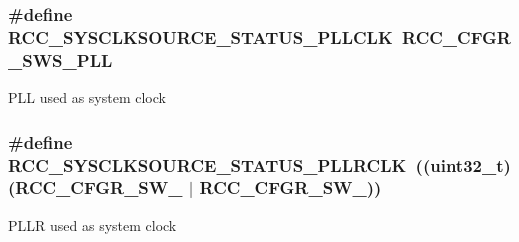 \subsubsection[{\texorpdfstring{R\+C\+C\+\_\+\+S\+Y\+S\+C\+L\+K\+S\+O\+U\+R\+C\+E\+\_\+\+S\+T\+A\+T\+U\+S\+\_\+\+P\+L\+L\+C\+LK}{RCC_SYSCLKSOURCE_STATUS_PLLCLK}}]{\setlength{\rightskip}{0pt plus 5cm}\#define R\+C\+C\+\_\+\+S\+Y\+S\+C\+L\+K\+S\+O\+U\+R\+C\+E\+\_\+\+S\+T\+A\+T\+U\+S\+\_\+\+P\+L\+L\+C\+LK~{\bf R\+C\+C\+\_\+\+C\+F\+G\+R\+\_\+\+S\+W\+S\+\_\+\+P\+LL}}\hypertarget{group___r_c_c___system___clock___source___status_ga4f05019ec09da478d084f44dbaad7d6d}{}\label{group___r_c_c___system___clock___source___status_ga4f05019ec09da478d084f44dbaad7d6d}
P\+LL used as system clock 
\subsubsection[{\texorpdfstring{R\+C\+C\+\_\+\+S\+Y\+S\+C\+L\+K\+S\+O\+U\+R\+C\+E\+\_\+\+S\+T\+A\+T\+U\+S\+\_\+\+P\+L\+L\+R\+C\+LK}{RCC_SYSCLKSOURCE_STATUS_PLLRCLK}}]{\setlength{\rightskip}{0pt plus 5cm}\#define R\+C\+C\+\_\+\+S\+Y\+S\+C\+L\+K\+S\+O\+U\+R\+C\+E\+\_\+\+S\+T\+A\+T\+U\+S\+\_\+\+P\+L\+L\+R\+C\+LK~((uint32\+\_\+t)({\bf R\+C\+C\+\_\+\+C\+F\+G\+R\+\_\+\+S\+W\+\_} $\vert$ {\bf R\+C\+C\+\_\+\+C\+F\+G\+R\+\_\+\+S\+W\+\_}))}\hypertarget{group___r_c_c___system___clock___source___status_gafb2aec046cc6759c3b290a3eeebe7d75}{}\label{group___r_c_c___system___clock___source___status_gafb2aec046cc6759c3b290a3eeebe7d75}
P\+L\+LR used as system clock 